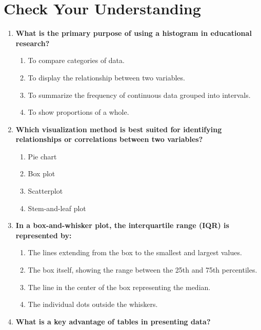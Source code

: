 \documentclass[
  letterpaper,
  DIV=11,
  numbers=noendperiod]{scrreprt}
\begin{document}
\section*{Check Your Understanding}\label{check-your-understanding-3}


\begin{enumerate}
\def\labelenumi{\arabic{enumi}.}
\item
  \textbf{What is the primary purpose of using a histogram in
  educational research?}

  \begin{enumerate}
  \def\labelenumii{\alph{enumii}.}
  \item
    To compare categories of data.
  \item
    To display the relationship between two variables.
  \item
    To summarize the frequency of continuous data grouped into
    intervals.
  \item
    To show proportions of a whole.
  \end{enumerate}
\item
  \textbf{Which visualization method is best suited for identifying
  relationships or correlations between two variables?}

  \begin{enumerate}
  \def\labelenumii{\alph{enumii}.}
  \item
    Pie chart
  \item
    Box plot
  \item
    Scatterplot
  \item
    Stem-and-leaf plot
  \end{enumerate}
\item
  \textbf{In a box-and-whisker plot, the interquartile range (IQR) is
  represented by:}

  \begin{enumerate}
  \def\labelenumii{\alph{enumii}.}
  \item
    The lines extending from the box to the smallest and largest values.
  \item
    The box itself, showing the range between the 25th and 75th
    percentiles.
  \item
    The line in the center of the box representing the median.
  \item
    The individual dots outside the whiskers.
  \end{enumerate}
\item
  \textbf{What is a key advantage of tables in presenting data?}


\end{enumerate}
\end{document}

